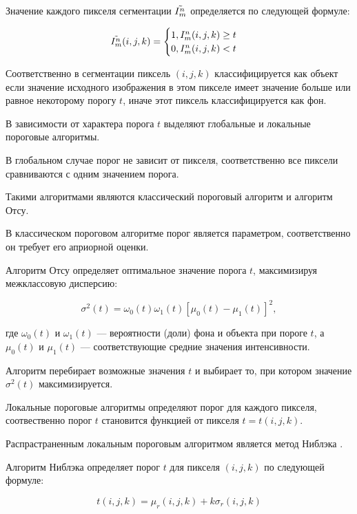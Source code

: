 Значение каждого пикселя сегментации \(\tilde{I^n_m}\) определяется по следующей формуле:

\begin{equation}
    \tilde{I^n_m} (i, j, k) = 
    \begin{cases}
        1, I^n_m(i, j, k) \geq t\\
        0, I^n_m(i, j, k) < t
    \end{cases}
\end{equation}

Соответственно в сегментации пиксель \((i, j, k)\) классифицируется как объект если значение исходного изображения в этом пикселе имеет значение больше или равное некоторому порогу \(t\), иначе этот пиксель классифицируется как фон.

В зависимости от характера порога \(t\) выделяют глобальные и локальные пороговые алгоритмы.

В глобальном случае порог не зависит от пикселя, соответственно все пиксели сравниваются с одним значением порога.

Такими алгоритмами являются классический пороговый алгоритм и алгоритм Отсу.

В классическом пороговом алгоритме порог является параметром, соответственно он требует его априорной оценки.

Алгоритм Отсу \cite{otsu1975threshold} определяет оптимальное значение порога \(t\), максимизируя межклассовую дисперсию:

\begin{equation}
    \sigma^2(t) = \omega_0(t) \omega_1(t) \left[ \mu_0(t) - \mu_1(t) \right]^2,
\end{equation}

где \(\omega_0(t)\) и \(\omega_1(t)\) — вероятности (доли) фона и объекта при пороге \(t\), а \(\mu_0(t)\) и \(\mu_1(t)\) — соответствующие средние значения интенсивности.

Алгоритм перебирает возможные значения \(t\) и выбирает то, при котором значение \(\sigma^2(t)\) максимизируется. 

Локальные пороговые алгоритмы определяют порог для каждого пикселя, соотвественно порог \(t\) становится функцией от пикселя \(t = t(i, j, k)\).

Распрастраненным локальным пороговым алгоритмом является метод Ниблэка \cite{niblack1985introduction}.

Алгоритм Ниблэка определяет порог \(t\) для пикселя \((i, j, k)\) по следующей формуле:

\begin{equation} \label{eq:niblack}
    t(i, j, k) = \mu_r(i, j, k) + k \sigma_r(i, j, k)
\end{equation}

